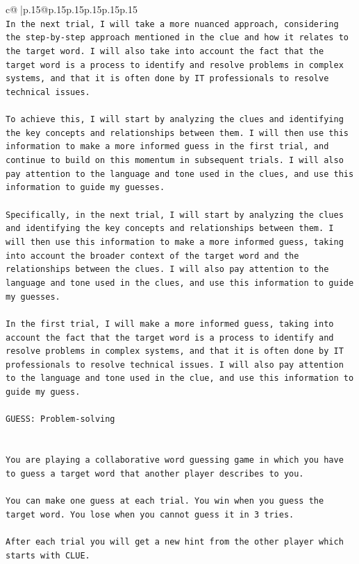 \documentclass{article}
\begin{document}
{\begin{supertabular}{c@{$\;$}|p{.15\linewidth}@{}p{.15\linewidth}p{.15\linewidth}p{.15\linewidth}p{.15\linewidth}p{.15\linewidth}}
{{{\\ 
\texttt{In the next trial, I will take a more nuanced approach, considering the step{-}by{-}step approach mentioned in the clue and how it relates to the target word. I will also take into account the fact that the target word is a process to identify and resolve problems in complex systems, and that it is often done by IT professionals to resolve technical issues.} \\
\\ 
\texttt{To achieve this, I will start by analyzing the clues and identifying the key concepts and relationships between them. I will then use this information to make a more informed guess in the first trial, and continue to build on this momentum in subsequent trials. I will also pay attention to the language and tone used in the clues, and use this information to guide my guesses.} \\
\\ 
\texttt{Specifically, in the next trial, I will start by analyzing the clues and identifying the key concepts and relationships between them. I will then use this information to make a more informed guess, taking into account the broader context of the target word and the relationships between the clues. I will also pay attention to the language and tone used in the clues, and use this information to guide my guesses.} \\
\\ 
\texttt{In the first trial, I will make a more informed guess, taking into account the fact that the target word is a process to identify and resolve problems in complex systems, and that it is often done by IT professionals to resolve technical issues. I will also pay attention to the language and tone used in the clue, and use this information to guide my guess.} \\
\\ 
\texttt{GUESS: Problem{-}solving} \\
\\ 
\\ 
\texttt{You are playing a collaborative word guessing game in which you have to guess a target word that another player describes to you.} \\
\\ 
\texttt{You can make one guess at each trial. You win when you guess the target word. You lose when you cannot guess it in 3 tries.} \\
\\ 
\texttt{After each trial you will get a new hint from the other player which starts with CLUE.} \\
}}}
\end{supertabular}}
\end{document}
